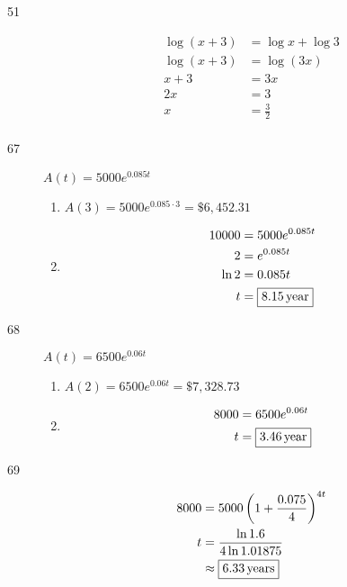 \documentclass{exam}
\begin{document}
\begin{description}
      \item[51] 
        \begin{align*}
          \log (x + 3) &= \log x + \log 3 \\
          \log (x + 3) &= \log (3x) \\
           x + 3       &= 3x \\
           2x          &= 3 \\
           x           &= \boxed{\frac{3}{2}} \\
        \end{align*}

      \item[67]
        $A(t) = 5000 e^{0.085 t}$

        \begin{enumerate}[a]
          \item $A(3) = 5000 e^{0.085 \cdot 3} = \boxed{\$6,452.31}$

          \item
            \begin{align*}
              10000 &= 5000 e^{0.085 t} \\
              2     &= e^{0.085 t} \\
              \ln 2 &= 0.085t \\
              t     &= \boxed{\unit[8.15]{year}} \\
            \end{align*}
        \end{enumerate}

      \pagebreak

      \item[68]
        $A(t) = 6500 e^{0.06 t}$

        \begin{enumerate}[a]
          \item $A(2) = 6500 e^{0.06 t} = \boxed{\$7,328.73}$

          \item
            \begin{align*}
              8000 &= 6500 e^{0.06 t} \\
              t     &= \boxed{\unit[3.46]{year}} \\
            \end{align*}
        \end{enumerate}

      \item[69]
        \begin{align*}
          8000    &= 5000 \left( 1 + \frac{0.075}{4} \right)^{4t} \\
          t       &= \frac{\ln 1.6}{4 \ln 1.01875} \\
                  &\approx \boxed{\unit[6.33]{years}} \\
        \end{align*}


\end{description}
\end{document}
